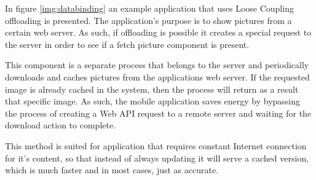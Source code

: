 In figure \ref{img:databinding} an example application that uses Loose Coupling offloading is presented. The application's purpose is to show pictures from a certain web server. As such, if offloading is possible it creates a special request to the server in order to see if a fetch picture component is present.

This component is a separate process that belongs to the server and periodically downloads and caches pictures from the applications web server. If the requested image is already cached in the system, then the process will return as a result that specific image. As such, the mobile application saves energy by bypassing the process of creating a Web API request to a remote server and waiting for the download action to complete.

This method is suited for application that requires constant Internet connection for it's content, so that instead of always updating it will serve a cached version, which is much faster and in most cases, just as accurate.